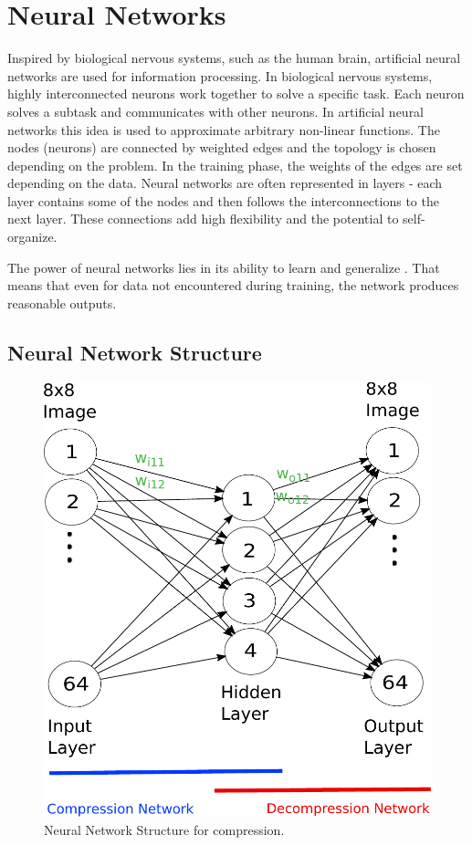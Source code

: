 \section{Neural Networks}
\label{sec:nn}

Inspired by biological nervous systems, such as the human brain, artificial neural networks are used for information processing. In biological nervous systems, highly interconnected neurons work together to solve a specific task. Each neuron solves a subtask and communicates with other neurons. In artificial neural networks this idea is used to approximate arbitrary  non-linear functions. The nodes (neurons) are connected by weighted edges and the topology is chosen depending on the problem. In the training phase, the weights of the edges are set depending on the data. Neural networks are often represented in layers - each layer contains some of the nodes and then follows the interconnections to the next layer. These connections add high flexibility and the potential to self-organize.

The power of neural networks lies in its ability to learn and generalize \cite{Haykin:1998:NNC:521706}. That means that even for data not encountered during training, the network produces reasonable outputs. 

\subsection{Neural Network Structure}
\label{sec:neural_net_structure}
\begin{figure}[tbp]
  \centering
  \includegraphics[width=\columnwidth]{images/nnStructure}
  \caption{Neural Network Structure for compression.}
  \label{fig:nnStructure}
\end{figure}

